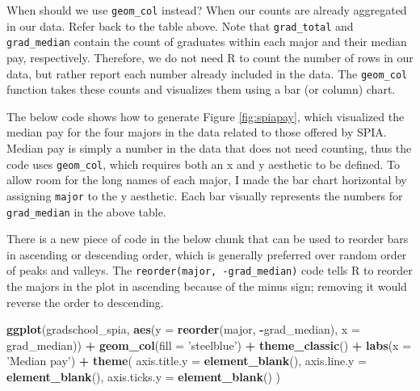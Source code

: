 \documentclass[
]{book}
\newenvironment{Shaded}{\begin{snugshade}}{\end{snugshade}}
\newcommand{\DataTypeTok}[1]{\textcolor[rgb]{0.13,0.29,0.53}{#1}}
\newcommand{\KeywordTok}[1]{\textcolor[rgb]{0.13,0.29,0.53}{\textbf{#1}}}
\newcommand{\NormalTok}[1]{#1}
\newcommand{\OperatorTok}[1]{\textcolor[rgb]{0.81,0.36,0.00}{\textbf{#1}}}
\newcommand{\StringTok}[1]{\textcolor[rgb]{0.31,0.60,0.02}{#1}}
\begin{document}
When should we use \texttt{geom\_col} instead? When our counts are already aggregated in our data. Refer back to the table above. Note that \texttt{grad\_total} and \texttt{grad\_median} contain the count of graduates within each major and their median pay, respectively. Therefore, we do not need R to count the number of rows in our data, but rather report each number already included in the data. The \texttt{geom\_col} function takes these counts and visualizes them using a bar (or column) chart.

The below code shows how to generate Figure \ref{fig:spiapay}, which visualized the median pay for the four majors in the data related to those offered by SPIA. Median pay is simply a number in the data that does not need counting, thus the code uses \texttt{geom\_col}, which requires both an x and y aesthetic to be defined. To allow room for the long names of each major, I made the bar chart horizontal by assigning \texttt{major} to the y aesthetic. Each bar visually represents the numbers for \texttt{grad\_median} in the above table.

There is a new piece of code in the below chunk that can be used to reorder bars in ascending or descending order, which is generally preferred over random order of peaks and valleys. The \texttt{reorder(major,\ -grad\_median)} code tells R to reorder the majors in the plot in ascending because of the minus sign; removing it would reverse the order to descending.

\begin{Shaded}
\begin{Highlighting}[]
\KeywordTok{ggplot}\NormalTok{(gradschool_spia, }\KeywordTok{aes}\NormalTok{(}\DataTypeTok{y =} \KeywordTok{reorder}\NormalTok{(major, }\OperatorTok{-}\NormalTok{grad_median), }\DataTypeTok{x =}\NormalTok{ grad_median)) }\OperatorTok{+}
\StringTok{  }\KeywordTok{geom_col}\NormalTok{(}\DataTypeTok{fill =} \StringTok{'steelblue'}\NormalTok{) }\OperatorTok{+}
\StringTok{  }\KeywordTok{theme_classic}\NormalTok{() }\OperatorTok{+}
\StringTok{  }\KeywordTok{labs}\NormalTok{(}\DataTypeTok{x =} \StringTok{'Median pay'}\NormalTok{) }\OperatorTok{+}
\StringTok{  }\KeywordTok{theme}\NormalTok{(}
    \DataTypeTok{axis.title.y =} \KeywordTok{element_blank}\NormalTok{(),}
    \DataTypeTok{axis.line.y =} \KeywordTok{element_blank}\NormalTok{(),}
    \DataTypeTok{axis.ticks.y =} \KeywordTok{element_blank}\NormalTok{()}
\NormalTok{  )}
\end{Highlighting}
\end{Shaded}
\end{document}
